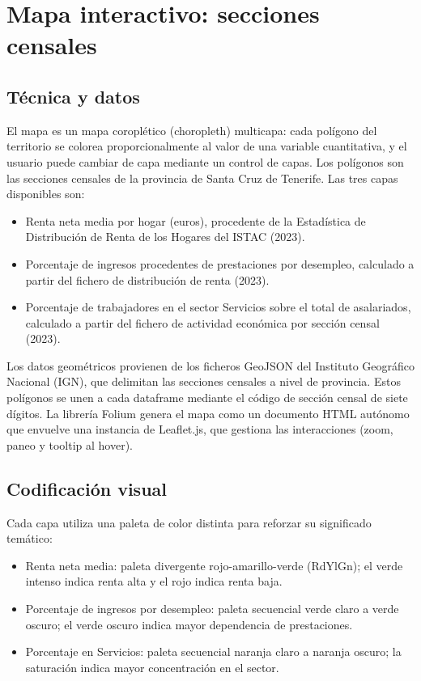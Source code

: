 \documentclass[spanish,a4paper,12pt,oneside]{extreport}
\begin{document}
\section{Mapa interactivo: secciones censales}

\subsection{Técnica y datos}

El mapa es un mapa coroplético (choropleth) multicapa: cada polígono del territorio se colorea proporcionalmente al valor de una variable cuantitativa, y el usuario puede cambiar de capa mediante un control de capas. Los polígonos son las secciones censales de la provincia de Santa Cruz de Tenerife. Las tres capas disponibles son:

\begin{itemize}
  \item Renta neta media por hogar (euros), procedente de la Estadística de Distribución de Renta de los Hogares del ISTAC (2023).
  \item Porcentaje de ingresos procedentes de prestaciones por desempleo, calculado a partir del fichero de distribución de renta (2023).
  \item Porcentaje de trabajadores en el sector Servicios sobre el total de asalariados, calculado a partir del fichero de actividad económica por sección censal (2023).
\end{itemize}

Los datos geométricos provienen de los ficheros GeoJSON del Instituto Geográfico Nacional (IGN), que delimitan las secciones censales a nivel de provincia. Estos polígonos se unen a cada dataframe mediante el código de sección censal de siete dígitos. La librería Folium genera el mapa como un documento HTML autónomo que envuelve una instancia de Leaflet.js, que gestiona las interacciones (zoom, paneo y tooltip al hover).

\subsection{Codificación visual}

Cada capa utiliza una paleta de color distinta para reforzar su significado temático:

\begin{itemize}
  \item Renta neta media: paleta divergente rojo-amarillo-verde (RdYlGn); el verde intenso indica renta alta y el rojo indica renta baja.
  \item Porcentaje de ingresos por desempleo: paleta secuencial verde claro a verde oscuro; el verde oscuro indica mayor dependencia de prestaciones.
  \item Porcentaje en Servicios: paleta secuencial naranja claro a naranja oscuro; la saturación indica mayor concentración en el sector.
\end{itemize}
\end{document}
